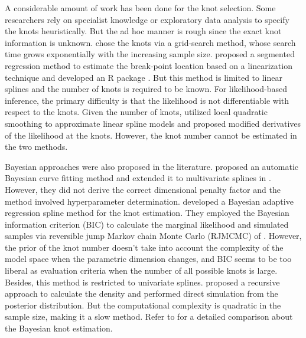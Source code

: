 A considerable amount of work has been done for the knot selection. Some researchers rely on specialist knowledge or exploratory data analysis to specify the knots heuristically. But the ad hoc manner is rough since the exact knot information is unknown. \citet{10.2307/2346413} chose the knots via a grid-search method, whose search time grows exponentially with the increasing sample size. \citet{muggeo2003estimating} proposed a segmented regression method to estimate the break-point location based on a linearization technique and developed an R package \citep{muggeo2008segmented}. But this method is limited to linear splines and the number of knots is required to be known. For likelihood-based inference, the primary difficulty is that the likelihood is not differentiable with respect to the knots. Given the number of knots, \citet{doi:10.1080/01621459.2015.1073154} utilized local quadratic smoothing to approximate linear spline models and \citet{doi:10.1080/01621459.2021.1947307} proposed modified derivatives of the likelihood at the knots. However, the knot number cannot be estimated in the two methods.

Bayesian approaches were also proposed in the literature. \citet{https://doi.org/10.1111/1467-9868.00128} proposed an automatic Bayesian curve fitting method and extended it to multivariate splines in \citet{Denison1998MARS}. However, they did not derive the correct dimensional penalty factor and the method involved hyperparameter determination. \citet{10.1093/biomet/88.4.1055} developed a Bayesian adaptive regression spline method for the knot estimation. They employed the Bayesian information criterion (BIC) to calculate the marginal likelihood and simulated samples via reversible jump Markov chain Monte Carlo (RJMCMC) of \citet{10.1093/biomet/82.4.711}. However, the prior of the knot number doesn't take into account the complexity of the model space when the parametric dimension changes, and BIC seems to be too liberal as evaluation criteria when the number of all possible knots is large. Besides, this method is restricted to univariate splines. \citet{fearnhead2006exact} proposed a recursive approach to calculate the density and performed direct simulation from the posterior distribution. But the computational complexity is quadratic in the sample size, making it a slow method. Refer to \citet{chen2011comparison} for a detailed comparison about the Bayesian knot estimation. %


